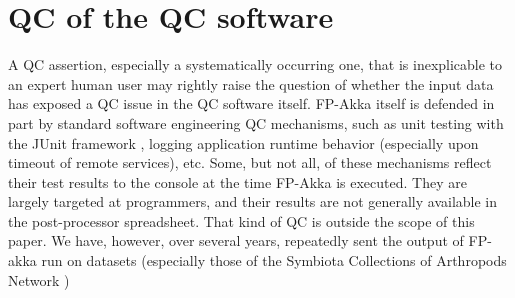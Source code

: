 \documentclass{article}
\begin{document}
\section{QC of the QC software}
A QC assertion, especially a systematically occurring one, that is inexplicable to an expert human user may rightly raise the question of whether the input data has exposed a QC issue in the QC software itself. FP-Akka itself is defended in part by standard software engineering QC mechanisms, such as unit testing
\citep{Fraser:2003:DPT:949344.949407} with the JUnit framework \citep{junit-web-2010}, logging application runtime behavior (especially upon timeout of remote services), etc. Some, but not all, of these mechanisms reflect their test results to the console at the time FP-Akka is executed. They are largely targeted at programmers, and their results are not generally available in the post-processor spreadsheet. That kind of QC is outside the scope of this paper.  We have, however, over several years, repeatedly sent the output of FP-akka run on datasets (especially those of the Symbiota Collections of Arthropods Network \citep{SCAN_TCN_website_2016})
\end{document}
